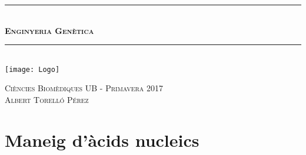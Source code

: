 \documentclass[a4paper,oneside,12pt]{article}
\begin{document}
\begin{titlepage}

\newcommand{\HRule}{\rule{\linewidth}{0.5mm}} %

\center %
\HRule \\[0.4cm]
{\Huge\bfseries\textsc{Enginyeria Genètica}} \\[0.4cm] %
\HRule \\[04cm]
\texttt{[image: Logo]} %

\vspace{1cm}
\textsc{\Large Ciències Biomèdiques UB - Primavera 2017}\\[0.5cm] %
\vspace{0.5cm}
\textsc{\large Albert Torelló Pérez}
\vfill %
\end{titlepage}

\renewcommand{\figurename}{\textsc{{Figura}}}
\renewcommand{\tablename}{\textsc{{Taula}}}
\renewcommand{\thefootnote}{\alph{footnote}}


\tableofcontents

\newpage
{}
\part{Maneig d'àcids nucleics}


\end{document}
